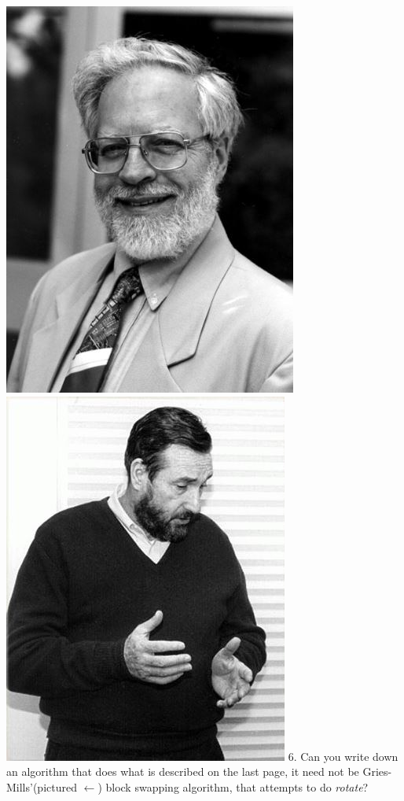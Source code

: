 \documentclass[12pt]{article}
\begin{document}
\includegraphics[scale = 0.25]{gries.jpg}\includegraphics[scale = 0.25]{mills.jpg}
6. Can you write down an algorithm that does what is described on the last page, it need not be Gries-Mills'(pictured $\leftarrow$) block swapping algorithm, that attempts to do \textit{rotate}?
\newpage
\end{document}
